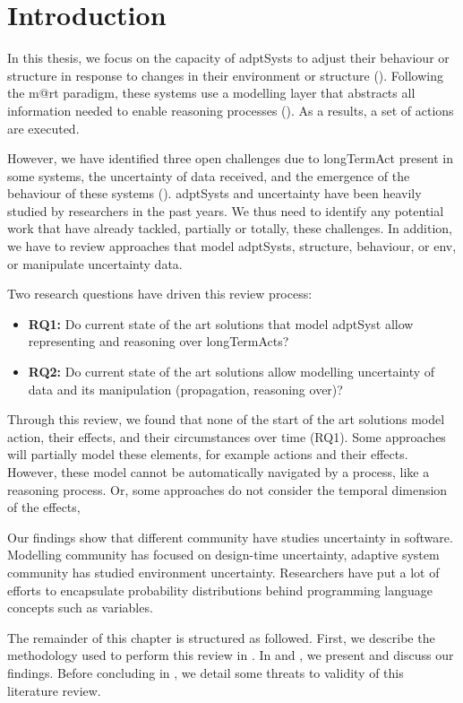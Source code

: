 \section{Introduction}

In this thesis, we focus on the capacity of \glspl{adptSyst} to adjust their behaviour or structure in response to changes in their environment or structure (\cf {}).
Following the \gls{m@rt} paradigm, these systems use a modelling layer that abstracts all information needed to enable reasoning processes (\cf {}).
As a results, a set of \glspl{action} are executed.

However, we have identified three open challenges due to \gls{longTermAct} present in some systems, the uncertainty of data received, and the emergence of the behaviour of these systems (\cf {}).
\Glspl{adptSyst} and uncertainty have been heavily studied by researchers in the past years.
We thus need to identify any potential work that have already tackled, partially or totally, these challenges.
In addition, we have to review approaches that model \glspl{adptSyst}, \gls{structure}, \gls{behaviour}, or \gls{env}, or manipulate uncertainty data.

Two research questions have driven this review process:
\begin{itemize}
	\item \textbf{RQ1:} Do current state of the art solutions that model \gls{adptSyst} allow representing and reasoning over \glspl{longTermAct}? 
	\item \textbf{RQ2:} Do current state of the art solutions allow modelling uncertainty of data and its manipulation (propagation, reasoning over)? 
\end{itemize} 

Through this review, we found that none of the start of the art solutions model action, their effects, and their circumstances over time (RQ1).
Some approaches will partially model these elements, for example actions and their effects.
However, these model cannot be automatically navigated by a process, like a reasoning process.
Or, some approaches do not consider the temporal dimension of the effects,

Our findings show that different community have studies uncertainty in software.
Modelling community has focused on design-time uncertainty, adaptive system community has studied environment uncertainty.
Researchers have put a lot of efforts to encapsulate probability distributions behind programming language concepts such as variables.

The remainder of this chapter is structured as followed.
First, we describe the methodology used to perform this review in .
In  and , we present and discuss our findings.
Before concluding in , we detail some threats to validity of this literature review.

